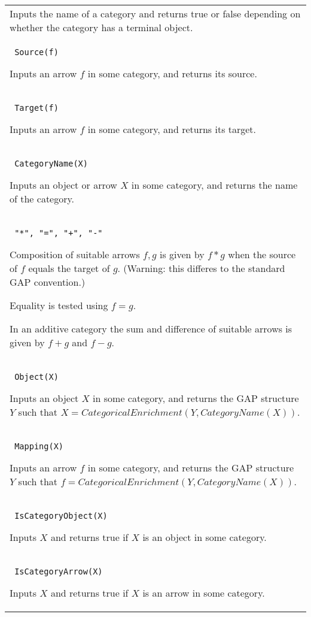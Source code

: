 \documentclass[a4paper,11pt]{report}
\begin{document}
{\begin{center}
\begin{tabular}{|l|}
 Inputs the name of a category and returns true or false depending on whether
the category has a terminal object. \\
 \index{Source} \texttt{ Source(f) } 

 Inputs an arrow $f$ in some category, and returns its source. \\
 \index{Target} \texttt{ Target(f) } 

 Inputs an arrow $f$ in some category, and returns its target. \\
 \index{CategoryName} \texttt{ CategoryName(X) } 

 Inputs an object or arrow $X$ in some category, and returns the name of the category. \\
 \texttt{ "*", "=", "+", "-" } 

 Composition of suitable arrows $f,g$ is given by $f*g$ when the source of $f$ equals the target of $g$. (Warning: this differes to the standard GAP convention.) 

 Equality is tested using $f=g$. 

In an additive category the sum and difference of suitable arrows is given by $f+g$ and $f-g$. \\
 \index{Object} \texttt{ Object(X) } 

 Inputs an object $X$ in some category, and returns the GAP structure $Y$ such that $X=CategoricalEnrichment(Y,CategoryName(X))$. \\
 \index{Mapping} \texttt{ Mapping(X) } 

 Inputs an arrow $f$ in some category, and returns the GAP structure $Y$ such that $f=CategoricalEnrichment(Y,CategoryName(X))$. \\
 \index{IsCategoryObject} \texttt{ IsCategoryObject(X) } 

 Inputs $X$ and returns true if $X$ is an object in some category. \\
 \index{IsCategoryArrow} \texttt{ IsCategoryArrow(X) } 

 Inputs $X$ and returns true if $X$ is an arrow in some category. \\
\end{tabular}\\[2mm]
\end{center}

 }

 
\end{document}
